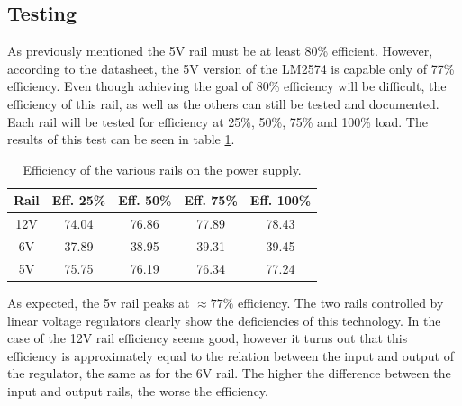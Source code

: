 \subsection{Testing}
As previously mentioned the 5V rail must be at least 80\% efficient. However, according to the datasheet, the 5V version of the LM2574 is capable only of 77\% efficiency. Even though achieving the goal of 80\% efficiency will be difficult, the efficiency of this rail, as well as the others can still be tested and documented. Each rail will be tested for efficiency at 25\%, 50\%, 75\% and 100\% load. The results of this test can be seen in table \ref{tab:efficiency}. 
\begin{table}[h!]
	\centering
	\begin{tabular}{| c | c | c | c | c |}
		\hline
		Rail & Eff. 25\% & Eff. 50\% & Eff. 75\% & Eff. 100\% \\
		\hline
		12V  & 74.04 & 76.86 & 77.89 & 78.43\\
		\hline
		6V   & 37.89 & 38.95 & 39.31 & 39.45\\
		\hline		
		5V   & 75.75 & 76.19 & 76.34 & 77.24\\
		\hline
	\end{tabular}
	\caption[Power supply efficiency]{Efficiency of the various rails on the power supply.}
	\label{tab:efficiency}
\end{table}
As expected, the 5v rail peaks at $\approx77\%$ efficiency. The two rails controlled by linear voltage regulators clearly show the deficiencies of this technology. In the case of the 12V rail efficiency seems good, however it turns out that this efficiency is approximately equal to the relation between the input and output of the regulator, the same as for the 6V rail. The higher the difference between the input and output rails, the worse the efficiency. 